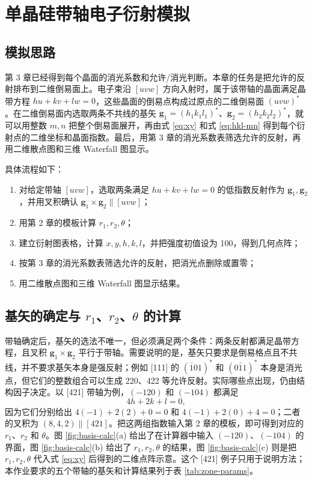 \section{单晶硅带轴电子衍射模拟}

\subsection{模拟思路}

第 3 章已经得到每个晶面的消光系数和允许/消光判断。本章的任务是把允许的反射排布到二维倒易面上。电子束沿 $[uvw]$ 方向入射时，属于该带轴的晶面满足晶带方程 $hu+kv+lw=0$，这些晶面的倒易点构成过原点的二维倒易面 $(uvw)^*$。在二维倒易面内选取两条不共线的基矢 $\bm{g}_1=(h_1k_1l_1)^*$、$\bm{g}_2=(h_2k_2l_2)^*$，就可以用整数 $m,n$ 把整个倒易面展开，再由式 \eqref{eq:xy} 和式 \eqref{eq:hkl-mn} 得到每个衍射点的二维坐标和晶面指数。最后，用第 3 章的消光系数表筛选允许的反射，再用二维散点图和三维 Waterfall 图显示。

具体流程如下：
\begin{enumerate}[label=（\arabic*）,leftmargin=2.2em,itemsep=1pt]
  \item 对给定带轴 $[uvw]$，选取两条满足 $hu+kv+lw=0$ 的低指数反射作为 $\bm{g}_1,\bm{g}_2$，并用叉积确认 $\bm{g}_1\times\bm{g}_2\parallel[uvw]$；
  \item 用第 2 章的模板计算 $r_1,r_2,\theta$；
  \item 建立衍射图表格，计算 $x,y,h,k,l$，并把强度初值设为 100，得到几何点阵；
  \item 按第 3 章的消光系数表筛选允许的反射，把消光点删除或置零；
  \item 用二维散点图和三维 Waterfall 图显示结果。
\end{enumerate}

\subsection{基矢的确定与 \texorpdfstring{$r_1$、$r_2$、$\theta$}{r1、r2、theta} 的计算}

带轴确定后，基矢的选法不唯一，但必须满足两个条件：两条反射都满足晶带方程，且叉积 $\bm{g}_1\times\bm{g}_2$ 平行于带轴。需要说明的是，基矢只要求是倒易格点且不共线，并不要求基矢本身是强反射；例如 [111] 的 $(\bar{1}01)^*$ 和 $(0\bar{1}1)^*$ 本身是消光点，但它们的整数组合可以生成 220、422 等允许反射。实际哪些点出现，仍由结构因子决定。以 [421] 带轴为例，$(-120)$ 和 $(-104)$ 都满足
\begin{equation}
4h+2k+l=0,
\end{equation}
因为它们分别给出 $4(-1)+2(2)+0=0$ 和 $4(-1)+2(0)+4=0$；二者的叉积为 $(8,4,2)\parallel[421]$。把这两组指数输入第 2 章的模板，即可得到对应的 $r_1$、$r_2$ 和 $\theta$。图 \ref{fig:basis-calc}(a) 给出了在计算器中输入 $(-120)$、$(-104)$ 的界面，图 \ref{fig:basis-calc}(b) 给出了 $r_1,r_2,\theta$ 的结果，图 \ref{fig:basis-calc}(c) 则是把 $r_1,r_2,\theta$ 代入式 \eqref{eq:xy} 后得到的二维点阵示意。这个 [421] 例子只用于说明方法；本作业要求的五个带轴的基矢和计算结果列于表 \ref{tab:zone-params}。

